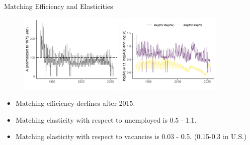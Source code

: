 \documentclass[aspectratio=169]{beamer}
\begin{document}
\begin{frame}{Matching Efficiency and Elasticities}
    \begin{figure}[!ht]
  \begin{center}
  \includegraphics[width = 0.45\textwidth]
  {figuretable/matching_efficiency_month_aggregate.png}
  \includegraphics[width = 0.45\textwidth]
  {figuretable/elasticity_month_aggregate.png}
  \end{center}
  \footnotesize
\end{figure} 
\begin{itemize}
    \item Matching efficiency declines after 2015.
    \item Matching elasticity with respect to unemployed is 0.5 - 1.1.
    \item Matching elasticity with respect to vacancies is 0.03 - 0.5. (0.15-0.3 in U.S.)
\end{itemize}
\end{frame}
\end{document}
